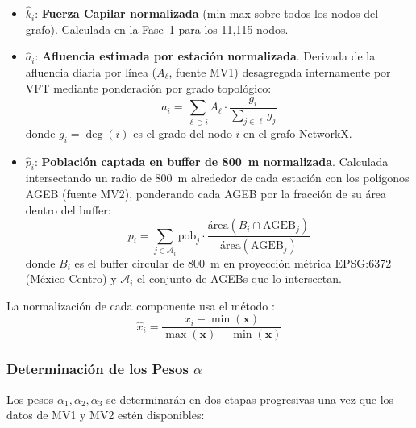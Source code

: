 \begin{itemize}
    \item $\hat{k}_i$: \textbf{Fuerza Capilar normalizada} (min-max sobre todos
    los nodos del grafo). Calculada en la Fase~1 para los 11{,}115 nodos.
    \item $\hat{a}_i$: \textbf{Afluencia estimada por estación normalizada}.
    Derivada de la afluencia diaria por línea ($A_\ell$, fuente MV1) desagregada
    internamente por VFT mediante ponderación por grado topológico:
    \begin{equation}
        a_i = \sum_{\ell \ni i} A_\ell \cdot
        \frac{g_i}{\displaystyle\sum_{j \in \ell} g_j}
        \label{eq:desagregacion-afluencia}
    \end{equation}
    donde $g_i = \deg(i)$ es el grado del nodo $i$ en el grafo NetworkX.
\item $\hat{p}_i$: \textbf{Población captada en buffer de 800~m normalizada}.
    Calculada intersectando un radio de 800~m alrededor de cada estación con los
    polígonos AGEB (fuente MV2), ponderando cada AGEB por la fracción de su área
    dentro del buffer:
    \begin{equation}
        p_i = \sum_{j \in \mathcal{A}_i} \text{pob}_j \cdot
        \frac{\text{área}(B_i \cap \text{AGEB}_j)}{\text{área}(\text{AGEB}_j)}
        \label{eq:poblacion-captada}
    \end{equation}
    donde $B_i$ es el buffer circular de 800~m en proyección métrica EPSG:6372
    (México Centro) y $\mathcal{A}_i$ el conjunto de AGEBs que lo intersectan.
\end{itemize}

La normalización de cada componente usa el método :
\begin{equation}
    \hat{x}_i = \frac{x_i - \min(\mathbf{x})}{\max(\mathbf{x}) - \min(\mathbf{x})}
    \label{eq:normalizacion-minmax}
\end{equation}

\subsubsection{Determinación de los Pesos \texorpdfstring{$\alpha$}{alpha}}
\label{subsubsec:pesos-alpha}

Los pesos $\alpha_1, \alpha_2, \alpha_3$ se determinarán en dos etapas
progresivas una vez que los datos de MV1 y MV2 estén disponibles:

